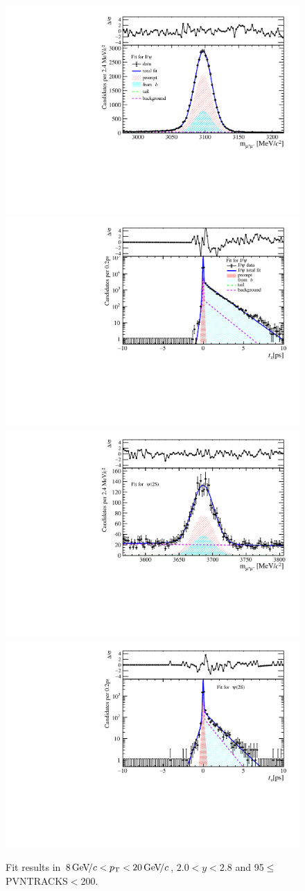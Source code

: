 \begin{figure}[H]
\begin{center}
\includegraphics[width=0.47\linewidth]{pdf/Jpsi/drawmass/n5y1pt5.pdf}
\includegraphics[width=0.47\linewidth]{pdf/Jpsi/2DFit/n5y1pt5.pdf}
\vspace*{-0.5cm}
\includegraphics[width=0.47\linewidth]{pdf/Psi2S/drawmass/n5y1pt5.pdf}
\includegraphics[width=0.47\linewidth]{pdf/Psi2S/2DFit/n5y1pt5.pdf}
\vspace*{-0.5cm}
\end{center}
\caption{Fit results in $8\text{\,Ge\kern -0.1em V\!/}c<p_{\mathrm{T}}<20\text{\,Ge\kern -0.1em V\!/}c$, $2.0<y<2.8$ and 95$\leq$PVNTRACKS$<$200.}
\label{Fitn5y1pt5}
\end{figure}
